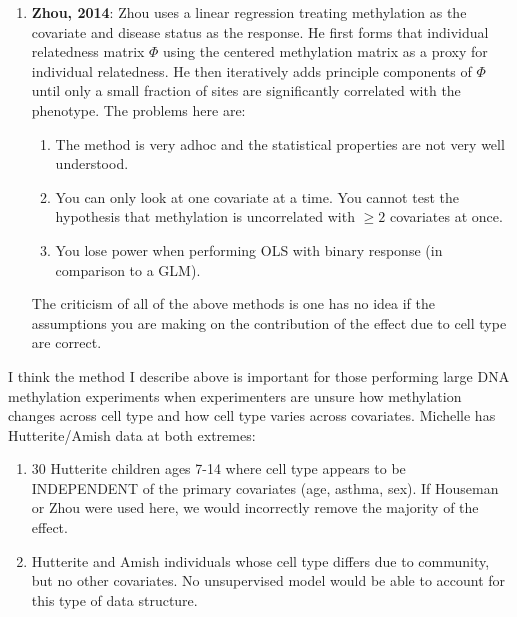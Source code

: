 \documentclass{article}
\begin{document}
\begin{enumerate}
		\item \textbf{Zhou, 2014}: Zhou uses a linear regression treating methylation as the covariate and disease status as the response. He first forms that individual relatedness matrix $\Phi$ using the centered methylation matrix as a proxy for individual relatedness. He then iteratively adds principle components of $\Phi$ until only a small fraction of sites are significantly correlated with the phenotype. The problems here are:
			\begin{enumerate}
			\item The method is very adhoc and the statistical properties are not very well understood. 
			\item You can only look at one covariate at a time. You cannot test the hypothesis that methylation is uncorrelated with $\geq 2$ covariates at once.
			\item You lose power when performing OLS with binary response (in comparison to a GLM).
			\end{enumerate}
			
	The criticism of all of the above methods is one has no idea if the assumptions you are making on the contribution of the effect due to cell type are correct. 
	\end{enumerate}
I think the method I describe above is important for those performing large DNA methylation experiments when experimenters are unsure how methylation changes across cell type and how cell type varies across covariates. Michelle has Hutterite/Amish data at both extremes:
\begin{enumerate}
\item 30 Hutterite children ages 7-14 where cell type appears to be INDEPENDENT of the primary covariates (age, asthma, sex). If Houseman or Zhou were used here, we would incorrectly remove the majority of the effect.
\item Hutterite and Amish individuals whose cell type differs due to community, but no other covariates. No unsupervised model would be able to account for this type of data structure.
\end{enumerate}
\end{document}
